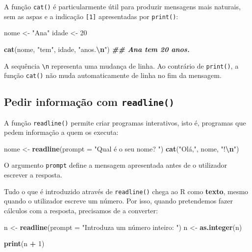 \documentclass[
  portuguese,
  11pt,
  openany]{book}
\newenvironment{Shaded}{\begin{snugshade}}{\end{snugshade}}
\newcommand{\AttributeTok}[1]{\textcolor[rgb]{0.13,0.29,0.53}{#1}}
\newcommand{\DecValTok}[1]{\textcolor[rgb]{0.00,0.00,0.81}{#1}}
\newcommand{\DocumentationTok}[1]{\textcolor[rgb]{0.56,0.35,0.01}{\textbf{\textit{#1}}}}
\newcommand{\FunctionTok}[1]{\textcolor[rgb]{0.13,0.29,0.53}{\textbf{#1}}}
\newcommand{\NormalTok}[1]{#1}
\newcommand{\OtherTok}[1]{\textcolor[rgb]{0.56,0.35,0.01}{#1}}
\newcommand{\SpecialCharTok}[1]{\textcolor[rgb]{0.81,0.36,0.00}{\textbf{#1}}}
\newcommand{\StringTok}[1]{\textcolor[rgb]{0.31,0.60,0.02}{#1}}
\begin{document}
A função \texttt{cat()} é particularmente útil para produzir mensagens mais naturais, sem as aspas e a indicação \texttt{{[}1{]}} apresentadas por \texttt{print()}:

\begin{Shaded}
\begin{Highlighting}[]
\NormalTok{nome }\OtherTok{\textless{}{-}} \StringTok{"Ana"}
\NormalTok{idade }\OtherTok{\textless{}{-}} \DecValTok{20}

\FunctionTok{cat}\NormalTok{(nome, }\StringTok{"tem"}\NormalTok{, idade, }\StringTok{"anos.}\SpecialCharTok{\textbackslash{}n}\StringTok{"}\NormalTok{)}
\DocumentationTok{\#\# Ana tem 20 anos.}
\end{Highlighting}
\end{Shaded}

A sequência \texttt{\textbackslash{}n} representa uma mudança de linha. Ao contrário de \texttt{print()}, a função \texttt{cat()} não muda automaticamente de linha no fim da mensagem.

\subsection{\texorpdfstring{Pedir informação com \texttt{readline()}}{Pedir informação com readline()}}\label{pedir-informauxe7uxe3o-com-readline}

A função \texttt{readline()} permite criar programas interativos, isto é, programas que pedem informação a quem os executa:

\begin{Shaded}
\begin{Highlighting}[]
\NormalTok{nome }\OtherTok{\textless{}{-}} \FunctionTok{readline}\NormalTok{(}\AttributeTok{prompt =} \StringTok{"Qual é o seu nome? "}\NormalTok{)}
\FunctionTok{cat}\NormalTok{(}\StringTok{"Olá,"}\NormalTok{, nome, }\StringTok{"!}\SpecialCharTok{\textbackslash{}n}\StringTok{"}\NormalTok{)}
\end{Highlighting}
\end{Shaded}

O argumento \texttt{prompt} define a mensagem apresentada antes de o utilizador escrever a resposta.

Tudo o que é introduzido através de \texttt{readline()} chega ao R como \textbf{texto}, mesmo quando o utilizador escreve um número. Por isso, quando pretendemos fazer cálculos com a resposta, precisamos de a converter:

\begin{Shaded}
\begin{Highlighting}[]
\NormalTok{n }\OtherTok{\textless{}{-}} \FunctionTok{readline}\NormalTok{(}\AttributeTok{prompt =} \StringTok{"Introduza um número inteiro: "}\NormalTok{)}
\NormalTok{n }\OtherTok{\textless{}{-}} \FunctionTok{as.integer}\NormalTok{(n)}

\FunctionTok{print}\NormalTok{(n }\SpecialCharTok{+} \DecValTok{1}\NormalTok{)}
\end{Highlighting}
\end{Shaded}
\end{document}
